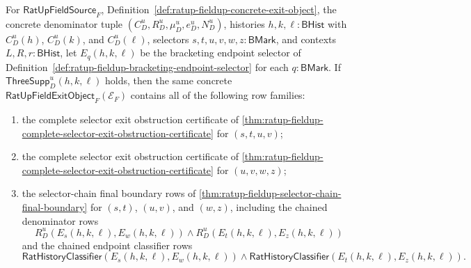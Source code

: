 \begin{theorem}
\label{thm:ratup-fieldup-adjacent-selector-chain-obstruction-coverage}
For $\mathsf{RatUpFieldSource}_F$,
Definition~\ref{def:ratup-fieldup-concrete-exit-object}, the concrete
denominator tuple $(C_D^u,R_D^u,\mu_D^u,e_D^u,N_D^u)$, histories
$h,k,\ell:\mathsf{BHist}$ with $C_D^u(h)$, $C_D^u(k)$, and $C_D^u(\ell)$,
selectors $s,t,u,v,w,z:\mathsf{BMark}$, and contexts
$L,R,r:\mathsf{BHist}$, let $E_q(h,k,\ell)$ be the bracketing endpoint selector
of Definition~\ref{def:ratup-fieldup-bracketing-endpoint-selector} for each
$q:\mathsf{BMark}$. If $\mathsf{ThreeSupp}_D^u(h,k,\ell)$ holds, then the same
concrete $\mathsf{RatUpFieldExitObject}_F(\mathcal E_F)$ contains all of the
following row families:
\begin{enumerate}
  \item the complete selector exit obstruction certificate of
  \autoref{thm:ratup-fieldup-complete-selector-exit-obstruction-certificate} for
  $(s,t,u,v)$;
  \item the complete selector exit obstruction certificate of
  \autoref{thm:ratup-fieldup-complete-selector-exit-obstruction-certificate} for
  $(u,v,w,z)$;
  \item the selector-chain final boundary rows of
  \autoref{thm:ratup-fieldup-selector-chain-final-boundary} for $(s,t)$,
  $(u,v)$, and $(w,z)$, including the chained denominator rows
  $$
  R_D^u(E_s(h,k,\ell),E_w(h,k,\ell))
  \land
  R_D^u(E_t(h,k,\ell),E_z(h,k,\ell))
  $$
  and the chained endpoint classifier rows
  $$
  \mathsf{RatHistoryClassifier}(E_s(h,k,\ell),E_w(h,k,\ell))
  \land
  \mathsf{RatHistoryClassifier}(E_t(h,k,\ell),E_z(h,k,\ell)).
  $$
\end{enumerate}
\end{theorem}
